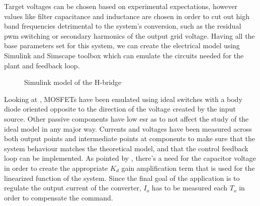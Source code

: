 Target voltages can be chosen based on experimental expectations, however values like filter capacitance and inductance are chosen in order to cut out high band frequencies detrimental to the system's conversion, such as the residual \gls{pwm} switching or secondary harmonics of the output grid voltage.
Having all the base parameters set for this system, we can create the electrical model using Simulink and Simscape toolbox which can emulate the circuits needed for the plant and feedback loop.
\begin{figure}[!ht]
    \centering
    \caption{Simulink model of the H-bridge}
    \label{fig:simhbridge}
\end{figure}
Looking at , MOSFETs have been emulated using ideal switches with a body diode oriented opposite to the direction of the voltage created by the input source.
Other passive components have low \gls{esr} as to not affect the study of the ideal model in any major way.
Currents and voltages have been measured across both output points and intermediate points at components to make sure that the system behaviour matches the theoretical model, and that the control feedback loop can be implemented.
As pointed by , there's a need for the capacitor voltage in order to create the appropriate $K_d$ gain amplification term that is used for the linearized function of the system.
Since the final goal of the application is to regulate the output current of the converter, $I_o$ has to be measured each $T_o$ in order to compensate the command.

